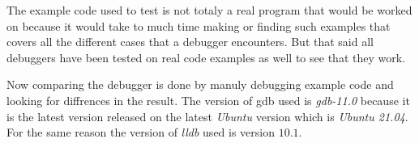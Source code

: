 
The example code used to test is not totaly a real program that would be worked on because it would take to much time making or finding such examples that covers all the different cases that a debugger encounters.
But that said all debuggers have been tested on real code examples as well to see that they work.


Now comparing the debugger is done by manuly debugging example code \cite{debugexample} and looking for diffrences in the result.
The version of \gls{gdb} used is \emph{gdb-11.0} because it is the latest version released on the latest \emph{Ubuntu} version which is \emph{Ubuntu 21.04}.
For the same reason the version of \emph{lldb} used is version $10.1$.


